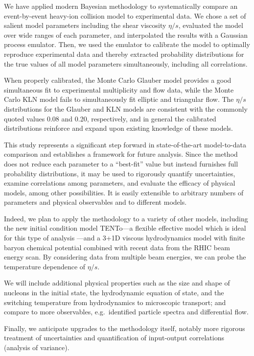 \documentclass[aps,prc,reprint,superscriptaddress,amsmath]{revtex4-1}
\newcommand{\trento}{T\raisebox{-.5ex}{R}ENTo}
\begin{document}
We have applied modern Bayesian methodology to systematically compare an event-by-event heavy-ion collision model to experimental data.
We chose a set of salient model parameters including the shear viscosity $\eta/s$, evaluated the model over wide ranges of each parameter, and interpolated the results with a Gaussian process emulator.
Then, we used the emulator to calibrate the model to optimally reproduce experimental data and thereby extracted probability distributions for the true values of all model parameters simultaneously, including all correlations.

When properly calibrated, the Monte Carlo Glauber model provides a good simultaneous fit to experimental multiplicity and flow data, while the Monte Carlo KLN model fails to simultaneously fit elliptic and triangular flow.
The $\eta/s$ distributions for the Glauber and KLN models are consistent with the commonly quoted values 0.08 and 0.20, respectively, and in general the calibrated distributions reinforce and expand upon existing knowledge of these models.

This study represents a significant step forward in state-of-the-art model-to-data comparison and establishes a framework for future analysis.
Since the method does not reduce each parameter to a ``best-fit'' value but instead furnishes full probability distributions, it may be used to rigorously quantify uncertainties, examine correlations among parameters, and evaluate the efficacy of physical models, among other possibilities.
It is easily extensible to arbitrary numbers of parameters and physical observables and to different models.

Indeed, we plan to apply the methodology to a variety of other models, including the new initial condition model \trento---a flexible effective model which is ideal for this type of analysis \cite{Moreland:2014oya}---and a 3+1D viscous hydrodynamics model with finite baryon chemical potential combined with recent data from the RHIC beam energy scan.
By considering data from multiple beam energies, we can probe the temperature dependence of $\eta/s$.

We will include additional physical properties such as the size and shape of nucleons in the initial state, the hydrodynamic equation of state, and the switching temperature from hydrodynamics to microscopic transport; and compare to more observables, e.g.\ identified particle spectra and differential flow.

Finally, we anticipate upgrades to the methodology itself, notably more rigorous treatment of uncertainties and quantification of input-output correlations (analysis of variance).
\end{document}
